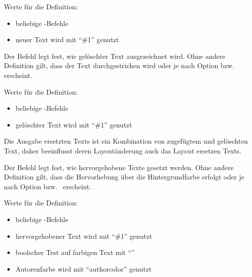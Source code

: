 Werte für die Definition:

\begin{itemize}
	\item beliebige -Befehle
	\item neuer Text wird mit "`\#1"' genutzt
\end{itemize}





Der Befehl  legt fest, wie gelöschter Text ausgezeichnet wird.
Ohne andere Definition gilt, dass der Text durchgestrichen wird oder je nach Option  bzw.\  erscheint.

Werte für die Definition:

\begin{itemize}
	\item beliebige -Befehle
	\item gelöschter Text wird mit "`\#1"' genutzt
\end{itemize}

Die Ausgabe ersetzten Texts ist ein Kombination von zugefügtem und gelöschten Text, daher beeinflusst deren Layoutänderung auch das Layout ersetzen Texts.





Der Befehl  legt fest, wie hervorgehobene Texte gesetzt werden.
Ohne andere Definition gilt, dass die Hervorhebung über die Hintergrundfarbe erfolgt oder je nach Option  bzw.\  erscheint.

Werte für die Definition:

\begin{itemize}
	\item beliebige -Befehle
	\item hervorgehobener Text wird mit "`\#1"' genutzt
	\item {} boolscher Test auf farbigen Text mit ``''
	\item Autorenfarbe wird mit ``authorcolor'' genutzt
\end{itemize}



